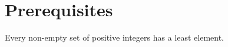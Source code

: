\chapter{Prerequisites}

\begin{Def}

    Every non-empty set of positive integers has a least element.
\end{Def}
\newpage

